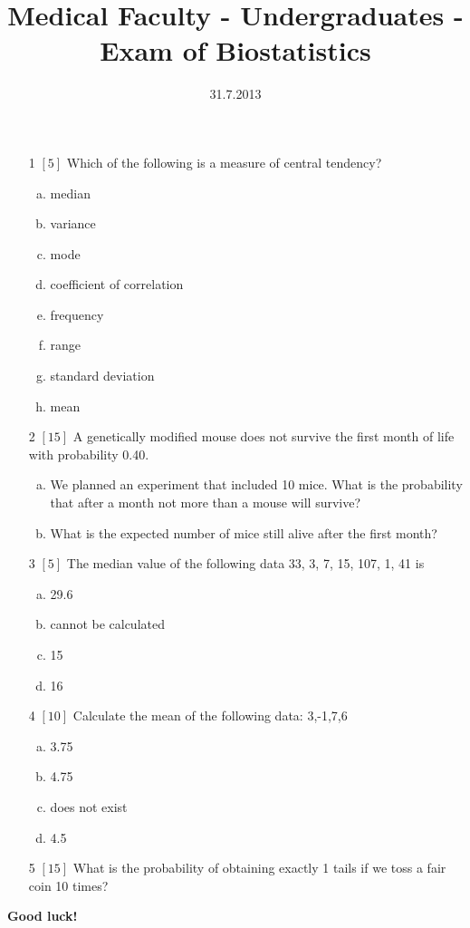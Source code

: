 \documentclass{article}
\title{Medical Faculty - Undergraduates  - Exam of Biostatistics}
\date{31.7.2013}
\begin{document}
\maketitle{}
\begin{itemize}
\item[1] {\small $\left[5\right]$ }Which of the following is a measure of central tendency?
\begin{enumerate}[(a)]
\item median 
\item variance 
\item mode 
\item coefficient of correlation 
\item frequency 
\item range 
\item standard deviation 
\item mean 
\end{enumerate}
\item[2] {\small $\left[15\right]$ }A genetically modified mouse does not survive the first month of life with probability 0.40.  
\begin{enumerate}[(a)]
\item We planned an experiment that included 10 mice. What is the probability that after a month not more than a mouse will survive? 
\vspace{\baselineskip} \vspace{\baselineskip} \vspace{\baselineskip}\item What is the expected number of mice still alive after the first month? 
\vspace{\baselineskip} \vspace{\baselineskip}\end{enumerate}
\item[3] {\small $\left[5\right]$ }The median value of the following data 33, 3, 7, 15, 107, 1, 41 is
\begin{enumerate}[(a)]
\item 29.6 
\item cannot be calculated 
\item 15 
\item 16 
\end{enumerate}
\item[4] {\small $\left[10\right]$ }Calculate the mean of the following data:  
3,-1,7,6\begin{enumerate}[(a)]
\item  3.75  
\item 4.75  
\item does not exist 
\item 4.5  
\end{enumerate}
\item[5] {\small $\left[15\right]$ }
What is the probability of obtaining exactly 1 tails if we toss a fair coin 10 times?
\end{itemize}
{\bf Good luck! }\newpage
\end{document}
